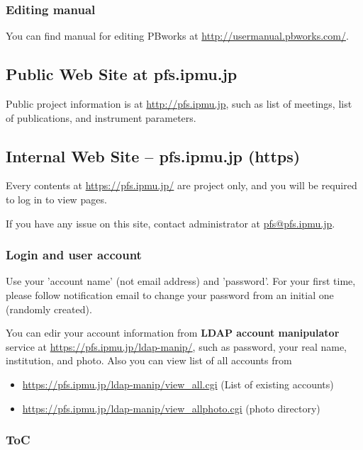 \documentclass[a4paper,notitlepage]{article}
\begin{document}
\subsubsection{Editing manual}

You can find manual for editing PBworks at 
\url{http://usermanual.pbworks.com/}. 


\subsection{Public Web Site at pfs.ipmu.jp}

Public project information is at \url{http://pfs.ipmu.jp}, 
such as list of meetings, list of publications, and instrument parameters. 

\subsection{Internal Web Site -- pfs.ipmu.jp (https)}

Every contents at \url{https://pfs.ipmu.jp/} are project only, and you will 
be required to log in to view pages. 

If you have any issue on this site, contact administrator 
at \url{pfs@pfs.ipmu.jp}. 

\subsubsection{Login and user account}

Use your 'account name' (not email address) and 'password'.
For your first time, please follow notification email to change your password 
from an initial one (randomly created). 

You can edir your account information from {\bf LDAP account manipulator} 
service at \url{https://pfs.ipmu.jp/ldap-manip/}, 
such as password, your real name, institution, and photo. 
Also you can view list of all accounts from 

\begin{itemize}
  \item \url{https://pfs.ipmu.jp/ldap-manip/view_all.cgi} (List of existing accounts)
  \item \url{https://pfs.ipmu.jp/ldap-manip/view_allphoto.cgi} (photo directory)
\end{itemize}

\subsubsection{ToC}
\end{document}
